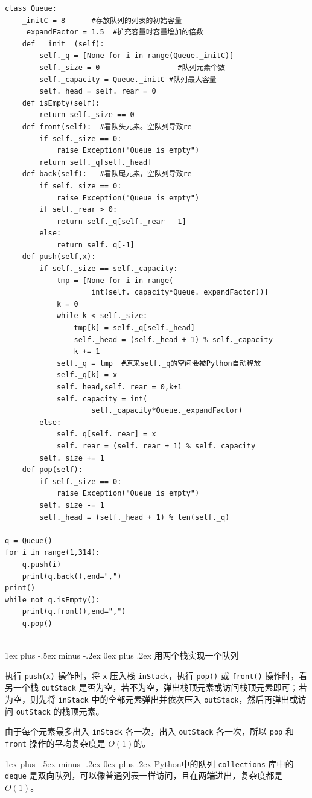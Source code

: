 \documentclass[10pt,UTF8,a4paper]{ctexart}
\makeatletter
\renewcommand{\subsubsection}{\@startsection{subsubsection}{3}{0mm}%
                                {1ex plus -.5ex minus -.2ex}%
                                {0ex plus .2ex}%
                                {\normalfont\small\bfseries}}
\makeatother
\begin{document}
\begin{multicols}{3}
\begin{lstlisting}[style=python]
class Queue:
	_initC = 8		#存放队列的列表的初始容量
	_expandFactor = 1.5  #扩充容量时容量增加的倍数
	def __init__(self):
		self._q = [None for i in range(Queue._initC)]
		self._size = 0				    #队列元素个数
		self._capacity = Queue._initC #队列最大容量
		self._head = self._rear = 0
	def isEmpty(self):
		return self._size == 0
	def front(self):  #看队头元素。空队列导致re
		if self._size == 0:
			raise Exception("Queue is empty")
		return self._q[self._head]
	def back(self):   #看队尾元素，空队列导致re
		if self._size == 0:
			raise Exception("Queue is empty")
		if self._rear > 0:
			return self._q[self._rear - 1]
		else:
			return self._q[-1]
	def push(self,x):
		if self._size == self._capacity:
			tmp = [None for i in range(
					int(self._capacity*Queue._expandFactor))]
			k = 0
			while k < self._size:
				tmp[k] = self._q[self._head]
				self._head = (self._head + 1) % self._capacity
				k += 1
			self._q = tmp  #原来self._q的空间会被Python自动释放
			self._q[k] = x
			self._head,self._rear = 0,k+1
			self._capacity = int(
					self._capacity*Queue._expandFactor)
		else:
			self._q[self._rear] = x
			self._rear = (self._rear + 1) % self._capacity
		self._size += 1
	def pop(self):
		if self._size == 0:
			raise Exception("Queue is empty")
		self._size -= 1
		self._head = (self._head + 1) % len(self._q)

q = Queue()
for i in range(1,314):
	q.push(i)
	print(q.back(),end=",")
print()
while not q.isEmpty():
	print(q.front(),end=",")
	q.pop()


\end{lstlisting}


\subsubsection{用两个栈实现一个队列}


执行 \verb|push(x)| 操作时，将 \verb|x| 压入栈 \verb|inStack|，执行 \verb|pop()| 或 \verb|front()| 操作时，看另一个栈 \verb|outStack| 是否为空，若不为空，弹出栈顶元素或访问栈顶元素即可；若为空，则先将 \verb|inStack| 中的全部元素弹出并依次压入 \verb|outStack|，然后再弹出或访问 \verb|outStack| 的栈顶元素。



由于每个元素最多出入 \verb|inStack| 各一次，出入 \verb|outStack| 各一次，所以 \verb|pop| 和 \verb|front| 操作的平均复杂度是 $O(1)$的。


\subsubsection{Python中的队列}
\verb|collections| 库中的 \verb|deque| 是双向队列，可以像普通列表一样访问，且在两端进出，复杂度都是 $O(1)$。


\end{multicols}
\end{document}
